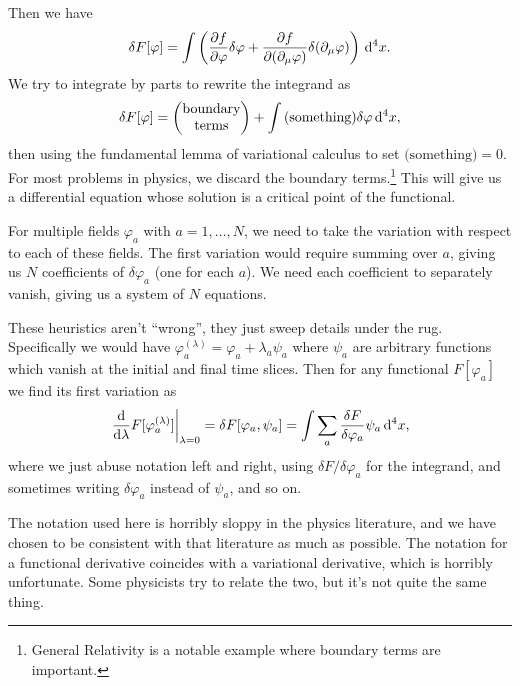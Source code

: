 Then we have
\begin{equation}
\delta F[\varphi] = \int\left(\frac{\partial f}{\partial\varphi}\delta\varphi
+\frac{\partial f}{\partial(\partial_{\mu}\varphi)}\delta(\partial_{\mu}\varphi)\right)\,\mathrm{d}^{4}x.
\end{equation}
We try to integrate by parts to rewrite the integrand as
\begin{equation}
\delta F[\varphi] = \begin{pmatrix}\mbox{boundary}\\\mbox{terms}
\end{pmatrix}
+ \int\mbox{(something)}\delta\varphi\,\mathrm{d}^{4}x,
\end{equation}
then using the fundamental lemma of
variational calculus to set $\mbox{(something)}=0$. For most problems in
physics, we discard the boundary terms.\footnote{General Relativity is a
notable example where boundary terms are important.} This will give us a
differential equation whose solution is a critical point of the
functional.

\M
For multiple fields $\varphi_{a}$ with $a=1,\dots,N$, we need to take
the variation with respect to each of these fields. The first variation
would require summing over $a$, giving us $N$ coefficients of
$\delta\varphi_{a}$ (one for each $a$). We need each coefficient to
separately vanish, giving us a system of $N$ equations.

\M
These heuristics aren't ``wrong'', they just sweep details under the
rug. Specifically we would have
$\varphi_{a}^{(\lambda)}=\varphi_{a}+\lambda_{a}\psi_{a}$ where
$\psi_{a}$ are arbitrary functions which vanish at the initial and final
time slices. Then for any functional $F[\varphi_{a}]$ we find its first
variation as
\begin{equation}
\left.\frac{\mathrm{d}}{\mathrm{d}\lambda}F[\varphi^{(\lambda)}_{a}]\right|_{\lambda=0}=\delta
F[\varphi_{a},\psi_{a}]=\int\sum_{a}\frac{\delta F}{\delta\varphi_{a}}\psi_{a}\,\mathrm{d}^{4}x,
\end{equation}
where we just abuse notation left and right, using
$\delta F/\delta\varphi_{a}$ for the integrand, and sometimes writing
$\delta\varphi_{a}$ instead of $\psi_{a}$, and so on.

\begin{ddanger}
The notation used here is horribly sloppy in the physics literature, and
we have chosen to be consistent with that literature as much as possible.
The notation for a functional derivative coincides with a variational
derivative, which is horribly unfortunate. Some physicists try to relate
the two, but it's not quite the same thing.
\end{ddanger}

